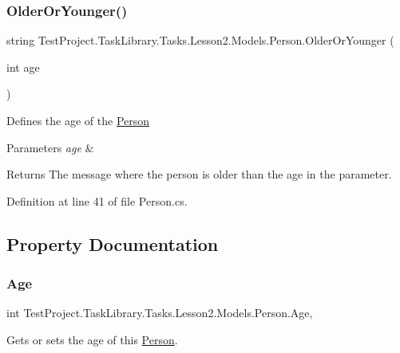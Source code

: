 \subsubsection{\texorpdfstring{OlderOrYounger()}{OlderOrYounger()}}
{\footnotesize\ttfamily string Test\+Project.\+Task\+Library.\+Tasks.\+Lesson2.\+Models.\+Person.\+Older\+Or\+Younger (\begin{DoxyParamCaption}\item[{int}]{age }\end{DoxyParamCaption})}



Defines the age of the \mbox{\hyperlink{struct_test_project_1_1_task_library_1_1_tasks_1_1_lesson2_1_1_models_1_1_person}{Person}} 


\begin{DoxyParams}{Parameters}
{\em age} & \\
\hline
\end{DoxyParams}
\begin{DoxyReturn}{Returns}
The message where the person is older than the age in the parameter.
\end{DoxyReturn}


Definition at line 41 of file Person.\+cs.



\subsection{Property Documentation}
\mbox{\label{struct_test_project_1_1_task_library_1_1_tasks_1_1_lesson2_1_1_models_1_1_person_a6ae5d9153128806b00d67afd00a49dec}} 
\subsubsection{\texorpdfstring{Age}{Age}}
{\footnotesize\ttfamily int Test\+Project.\+Task\+Library.\+Tasks.\+Lesson2.\+Models.\+Person.\+Age\hspace{0.3cm}{\ttfamily [get]}, {\ttfamily [set]}}



Gets or sets the age of this \mbox{\hyperlink{struct_test_project_1_1_task_library_1_1_tasks_1_1_lesson2_1_1_models_1_1_person}{Person}}. 



